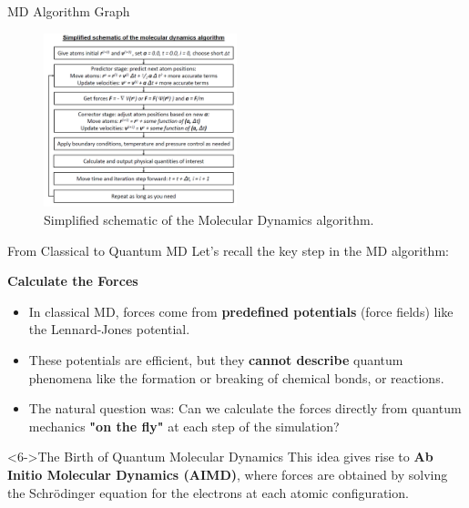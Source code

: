 \begin{frame}{MD Algorithm Graph}
    \begin{figure}
        \includegraphics[width=0.5\textwidth]{images/algorithm.png}
        \caption{Simplified schematic of the Molecular Dynamics algorithm.}
    \end{figure}
\end{frame}


\begin{frame}{From Classical to Quantum MD}
    Let's recall the key step in the MD algorithm:
    \pause
    \begin{center}
        \large \textbf{Calculate the Forces}
    \end{center}
    \pause
    
    \begin{itemize}
        \item In classical MD, forces come from \textbf{predefined potentials} (force fields) like the Lennard-Jones potential.
        \pause
        \bigskip
        \item These potentials are efficient, but they \textbf{cannot describe} quantum phenomena like the formation or breaking of chemical bonds, or reactions.
        \pause
        \bigskip
        \item The natural question was: Can we calculate the forces directly from quantum mechanics \textbf{"on the fly"} at each step of the simulation?
    \end{itemize}
    \pause
    
    \begin{alertblock}<6->{The Birth of Quantum Molecular Dynamics}
        This idea gives rise to \textbf{Ab Initio Molecular Dynamics (AIMD)}, where forces are obtained by solving the Schrödinger equation for the electrons at each atomic configuration.
    \end{alertblock}
\end{frame}

